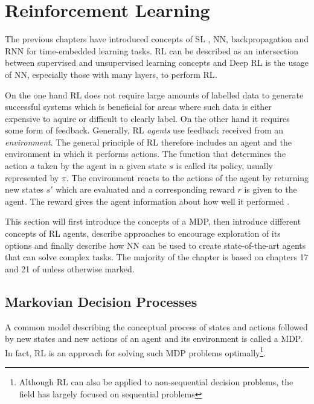\section{Reinforcement Learning}

The previous chapters have introduced concepts of \ac{SL} , \ac{NN}, backpropagation and \ac{RNN} for time-embedded
learning tasks. \ac{RL} can be described as an intersection between supervised and unsupervised learning concepts and
Deep \ac{RL} is the usage of \ac{NN}, especially those with many layers, to perform \ac{RL}.

On the one hand \ac{RL}  does not require large amounts of labelled data to generate successful systems which is
beneficial for areas where such data is either expensive to aquire or difficult to clearly label. On the other hand it
requires some form of feedback. Generally, \ac{RL} \emph{agents} use feedback received from an \emph{environment}.  The
general principle of \ac{RL} therefore includes an agent and the environment in which it performs actions. The function
that determines the action $a$  taken by the agent in a given state $s$ is called its policy, usually represented by
$\pi$.  The environment reacts to the actions of the agent by returning new states $s'$ which are evaluated and a
corresponding reward $r$ is given to the agent. The reward gives the agent information about how well it performed
\citep[p.830f.]{russell2016artificial}.

This section will first introduce the concepts of a \ac{MDP}, then introduce different concepts of \ac{RL} agents,
describe approaches to encourage exploration of its options and finally describe how \ac{NN} can be used to create
state-of-the-art agents that can solve complex tasks. The majority of the chapter is based on
chapters 17 and 21 of \citet[]{russell2016artificial} unless otherwise marked.

\subsection{Markovian Decision Processes}%
\label{ssub:markovian_decision_processes}

A common model describing the conceptual process of states and actions followed by new states and new actions of an
agent and its environment is called a \acf {MDP}. In fact, \ac{RL} is an approach for solving such \ac{MDP} problems
optimally\footnote{Although \ac{RL} can also be applied to non-sequential decision problems, the field has largely focused on
sequential problems}.

